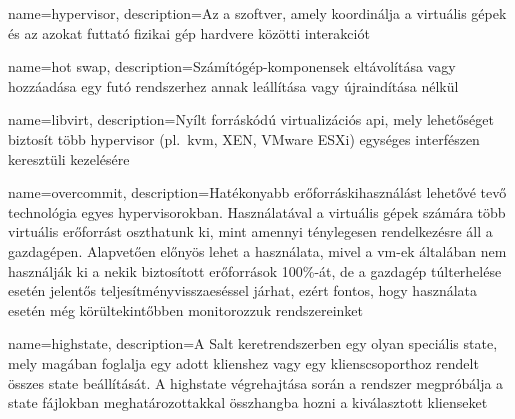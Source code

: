 
{
	name=hypervisor,
	description={Az a szoftver, amely koordinálja a virtuális gépek és az azokat futtató fizikai gép hardvere közötti interakciót}
}

{
	name={hot swap},
	description={Számítógép-komponensek eltávolítása vagy hozzáadása egy futó rendszerhez annak leállítása vagy újraindítása nélkül}
}

{
	name=libvirt,
	description={Nyílt forráskódú virtualizációs \acrshort{api}, mely lehetőséget biztosít több \gls{hypervisor} (pl.~\acrshort{kvm}, XEN, VMware ESXi) egységes interfészen keresztüli kezelésére}
}

{
	name=overcommit,
	description={Hatékonyabb erőforráskihasználást lehetővé tevő technológia egyes \gls{hypervisor}okban. Használatával a virtuális gépek számára több virtuális erőforrást oszthatunk ki, mint amennyi ténylegesen rendelkezésre áll a gazdagépen. Alapvetően előnyös lehet a használata, mivel a \acrshort{vm}-ek általában nem használják ki a nekik biztosított erőforrások 100\%-át, de a gazdagép túlterhelése esetén jelentős teljesítményvisszaeséssel járhat, ezért fontos, hogy használata esetén még körültekintőbben monitorozzuk rendszereinket~\cite{RedHatKvmOvercommit}}
}

{
	name=highstate,
	description={A Salt keretrendszerben egy olyan speciális state, mely magában foglalja egy adott klienshez vagy egy klienscsoporthoz rendelt összes state beállítását. A highstate végrehajtása során a rendszer megpróbálja a state fájlokban meghatározottakkal összhangba hozni a kiválasztott klienseket}
}
